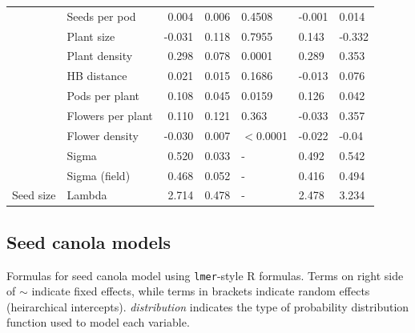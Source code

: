 \documentclass[12pt]{article} %
\begin{document}
\begin{longtable}{l|l|r|r|l|l|l}
\cline{2-7}
 & Seeds per pod & 0.004 & 0.006 & 0.4508 & -0.001 & 0.014\\
\cline{2-7}
 & Plant size & -0.031 & 0.118 & 0.7955 & 0.143 & -0.332\\
\cline{2-7}
 & Plant density & 0.298 & 0.078 & 0.0001 & 0.289 & 0.353\\
\cline{2-7}
 & HB distance & 0.021 & 0.015 & 0.1686 & -0.013 & 0.076\\
\cline{2-7}
 & Pods per plant & 0.108 & 0.045 & 0.0159 & 0.126 & 0.042\\
\cline{2-7}
 & Flowers per plant & 0.110 & 0.121 & 0.363 & -0.033 & 0.357\\
\cline{2-7}
 & Flower density & -0.030 & 0.007 & $<$0.0001 & -0.022 & -0.04\\
\cline{2-7}
 & Sigma & 0.520 & 0.033 & - & 0.492 & 0.542\\
\cline{2-7}
 & Sigma (field) & 0.468 & 0.052 & - & 0.416 & 0.494\\
\cline{2-7}
\multirow{-12}{*}{\raggedright\arraybackslash Seed size} & Lambda & 2.714 & 0.478 & - & 2.478 & 3.234\\
\hline
\end{longtable}
\endgroup{}

\clearpage

\subsection*{Seed canola models}

Formulas for seed canola model using \texttt{lmer}-style R formulas. Terms on right side of $\sim$ indicate fixed effects, while terms in brackets indicate random effects (heirarchical intercepts). \textit{distribution} indicates the type of probability distribution function used to model each variable.
\end{document}
